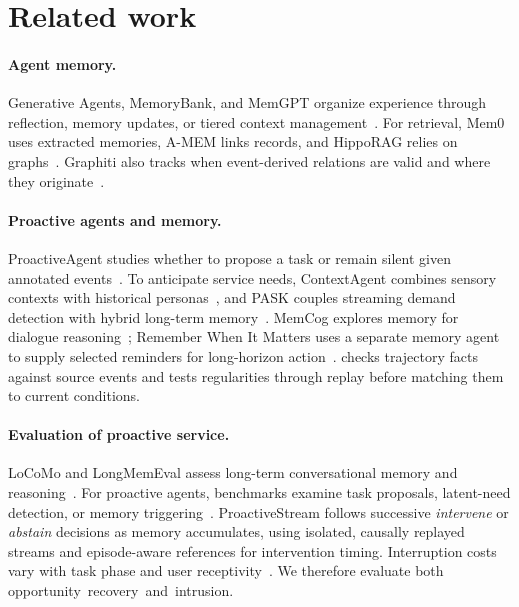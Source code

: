 \section{Related work}
\label{sec:related}

\paragraph{Agent memory.}
Generative Agents, MemoryBank, and MemGPT organize experience through reflection, memory updates, or tiered context management~\citep{park2023generative,zhong2024memorybank,packer2023memgpt}.
For retrieval, Mem0 uses extracted memories, A-MEM links records, and HippoRAG relies on graphs~\citep{chhikara2025mem0,xu2025amem,gutierrez2024hipporag}.
Graphiti also tracks when event-derived relations are valid and where they originate~\citep{zep2026graphiti}.

\paragraph{Proactive agents and memory.}
ProactiveAgent studies whether to propose a task or remain silent given annotated events~\citep{lu2025proactiveagent}.
To anticipate service needs, ContextAgent combines sensory contexts with historical personas~\citep{yang2025contextagent}, and PASK couples streaming demand detection with hybrid long-term memory~\citep{xie2026pask}.
\mbox{MemCog} explores memory for dialogue reasoning~\citep{li2026memcog}; Remember When It Matters uses a separate memory agent to supply selected reminders for long-horizon action~\citep{wu2026remember}.
\system{} checks trajectory facts against source events and tests regularities through replay before matching them to current conditions.

\paragraph{Evaluation of proactive service.}
LoCoMo and LongMemEval assess long-term conversational memory and reasoning~\citep{maharana2024locomo,wu2025longmemeval}.
For proactive agents, benchmarks examine task proposals, latent-need detection, or memory triggering~\citep{lu2025proactiveagent,xie2026pask,li2026memcog}.
ProactiveStream follows successive \emph{intervene} or \emph{abstain} decisions as memory accumulates, using isolated, causally replayed streams and episode-aware references for intervention timing.
Interruption costs vary with task phase and user receptivity~\citep{adamczyk2004ifnotnow,iqbal2007breakpoints,iqbal2008notification,mehrotra2016myphone}.
We therefore evaluate both \mbox{opportunity recovery and intrusion}.
